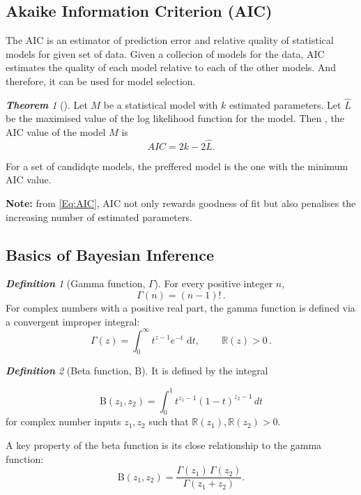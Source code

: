 \documentclass[12pt,oneside,a4paper]{book}
\theoremstyle{definition}
\theoremstyle{remark}
\newtheorem{defn}{\bf Definition}[subsection]
\newtheorem{thm}{\bf Theorem}[subsection]
\begin{document}
				\subsection{Akaike Information Criterion (AIC)}
				The AIC is an estimator of prediction error and relative quality of statistical models for given set of data. Given a collecion of models for the data, AIC estimates the quality of each model relative to each of the other models. And therefore, it can be used for model selection.
				\begin{thm}[\label{Thm:AIC}\cite{akaikeNewLookStatistical1974}]
					Let $M$ be a statistical model with $k$ estimated parameters. Let $\hat{L}$ be the maximised value of the log likelihood function for the model. Then , the AIC value of the model $M$ is
					\begin{equation} \label{Eq:AIC}
						AIC = 2k-2 \hat{L}.
					\end{equation}
				\end{thm}

				For a set of candidqte models, the preffered model is the one with the minimum AIC value.

				\textbf{Note:} from \ref{Eq:AIC}, AIC not only rewards goodness of fit but also penalises the increasing number of estimated parameters.


			\subsection{Basics of Bayesian Inference}
				\begin{defn}[Gamma function, $\Gamma$]
					For every positive integer $n$,
					\begin{equation}\label{eqn:gamma_int}
						\Gamma (n)=(n-1)!\,.
					\end{equation}
					For complex numbers with a positive real part, the gamma function is defined via a convergent improper integral:
						\begin{equation}\label{eqn:gamma_complex}
							\Gamma (z)=\int _{0}^{\infty }t^{z-1}e^{-t}{\text{ d}}t,\ \qquad \mathbb{R} (z)>0\,.
						\end{equation}
				\end{defn}

				\begin{defn}[Beta function, $\mathrm{B}$]
					It is defined by the integral

						\begin{equation} \label{eqn:beta}
							\mathrm {B} (z_{1},z_{2})=\int _{0}^{1}t^{z_{1}-1}(1-t)^{z_{2}-1}\,dt			\end{equation}
					for complex number inputs $z_{1},z_{2}$ such that $\mathbb{R}	 (z_{1}),\mathbb{R}(z_{2})>0$.
				\end{defn}
				A key property of the beta function is its close relationship to the gamma function:
				\begin{equation}
					\mathrm {B} (z_{1},z_{2})={\frac {\Gamma (z_{1})\,\Gamma (z_{2})}{\Gamma (z_{1}+z_{2})}}.
				\end{equation}
\end{document}
